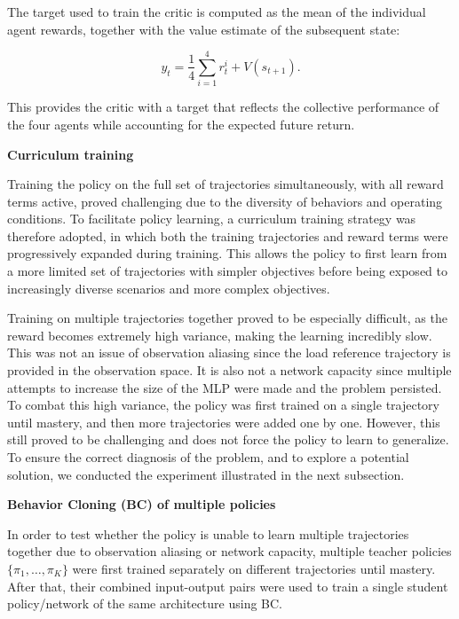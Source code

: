 The target used to train the critic is computed as the mean of the
individual agent rewards, together with the value estimate of the
subsequent state:

\begin{equation}
  y_t = \frac{1}{4}\sum_{i=1}^{4} r_t^i + V(s_{t+1}).
  \label{eq:critic-target}
\end{equation}

This provides the critic with a target that reflects the collective
performance of the four agents while accounting for the expected future
return.



\noindent\textbf{Curriculum training}

Training the policy on the full set of trajectories simultaneously, with
all reward terms active, proved challenging due to the diversity of
behaviors and operating conditions. To facilitate policy learning, a
curriculum training strategy was therefore adopted, in which both the
training trajectories and reward terms were progressively expanded
during training. This allows the policy to first learn from a more
limited set of trajectories with simpler objectives before being
exposed to increasingly diverse scenarios and more complex objectives.

Training on multiple trajectories together proved to be especially
difficult, as the reward becomes extremely high variance, making the
learning incredibly slow. This was not an issue of observation aliasing
since the load reference trajectory is provided in the observation
space. It is also not a network capacity since multiple attempts to
increase the size of the MLP were made and the problem persisted. To
combat this high variance, the policy was first trained on a single
trajectory until mastery, and then more trajectories were added one by
one. However, this still proved to be challenging and does not force the
policy to learn to generalize. To ensure the correct diagnosis of the
problem, and to explore a potential solution, we conducted the
experiment illustrated in the next subsection.

\noindent\textbf{Behavior Cloning (BC) of multiple policies}

 In order to test whether the policy is unable to learn multiple
trajectories together due to observation aliasing or network capacity,
multiple teacher policies $\{\pi_1,\dots,\pi_K\}$ were first trained
separately on different trajectories until mastery. After that, their
combined input-output pairs were used to train a single student
policy/network of the same architecture using BC.

